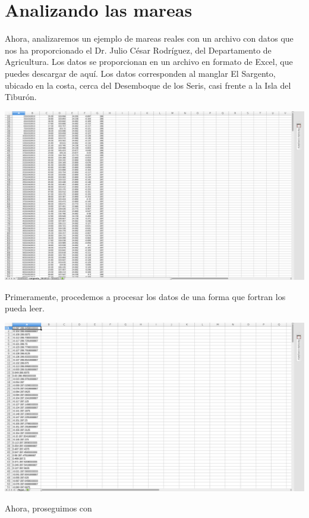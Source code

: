 \documentclass[12pt]{article}
\begin{document}
\section{Analizando las mareas}

	Ahora, analizaremos un ejemplo de mareas reales con un archivo con datos que nos ha proporcionado el Dr. Julio César Rodríguez, del Departamento de Agricultura. Los datos se proporcionan en un archivo en formato de Excel, que puedes descargar de aquí. Los datos corresponden al manglar El Sargento, ubicado en la costa, cerca del Desemboque de los Seris, casi frente a la Isla del Tiburón.
	
		 \begin{center}
	\includegraphics[width=20cm]{d.png}\\
\end{center}	 
	
	Primeramente, procedemos a procesar los datos de una forma que fortran los pueda leer.
	
		 \begin{center}
	\includegraphics[width=20cm]{d2.png}\\
\end{center}	 

Ahora, proseguimos con
\end{document}
